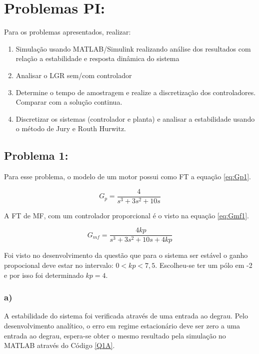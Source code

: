 \section*{Problemas PI:}

Para os problemas apresentados, realizar:
\begin{enumerate}[label=\alph*)]
    \item Simulação usando MATLAB/Simulink realizando análise dos resultados com relação a estabilidade e 
    resposta dinâmica do sistema
    \item Analisar o LGR sem/com controlador
    \item Determine o tempo de amostragem e realize a discretização dos controladores. Comparar com a
    solução continua.
    \item Discretizar os sistemas (controlador e planta) e analisar a estabilidade usando o método de Jury e
    Routh Hurwitz.
\end{enumerate}
    

\subsection*{Problema 1:}

Para esse problema, o modelo de um motor possui como FT a equação \ref{eq:Gp1}. 

\begin{equation}
    G_p = \frac{4}{s^3+3s^2+10s}
    \label{eq:Gp1}
\end{equation}

A FT de MF, com um controlador proporcional é o visto na equação \ref{eq:Gmf1}.

\begin{equation}
    G_{mf} = \frac{4kp}{s^3+3s^2+10s + 4kp}
    \label{eq:Gmf1}
\end{equation}

Foi visto no desenvolvimento da questão que para o sistema ser estável o ganho propocional deve estar
no intervalo: $0<kp<7,5$. Escolheu-se ter um pólo em -2 e por isso foi determinado $kp = 4$.


\subsubsection*{a)}
    A estabilidade do sistema foi verificada através de uma entrada ao degrau. Pelo desenvolvimento analítico,
    o erro em regime estacionário deve ser zero a uma entrada ao degrau, espera-se obter o mesmo resultado
    pela simulação no MATLAB através do Código \ref{Q1A}.

